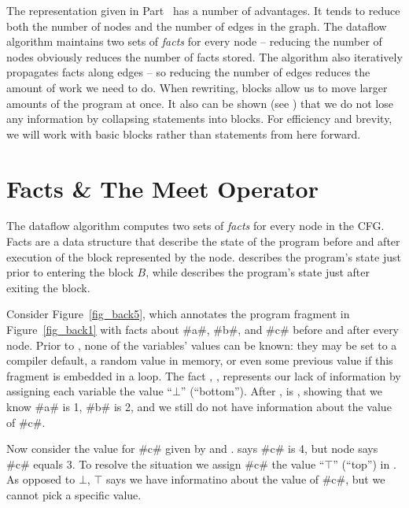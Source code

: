 \documentclass[12pt]{report}
\begin{document}
The representation given in Part~ has a number of
advantages. It tends to reduce both the number of nodes and the number
of edges in the graph. The dataflow algorithm maintains two sets of
\emph{facts} for every node -- reducing the number of nodes obviously
reduces the number of facts stored. The algorithm also iteratively
propagates facts along edges -- so reducing the number of edges
reduces the amount of work we need to do. When rewriting, blocks allow
us to move larger amounts of the program at once. It also can be shown
(see \citep{AhoXX}) that we do not lose any information by collapsing
statements into blocks. For efficiency and brevity, we will work with
basic blocks rather than statements from here forward.


\section{Facts \& The Meet Operator}
\label{sec_back4}

The dataflow algorithm computes two sets of \emph{facts} for every
node in the CFG. Facts are a data structure that describe the state of
the program before and after execution of the block represented by the
node. \inBa describes the program's state just prior to entering the
block $B$, while \outBa describes the program's state just after
exiting the block.



Consider Figure~\ref{fig_back5}, which annotates the program fragment
in Figure~\ref{fig_back1} with facts about #a#, #b#, and #c# before
and after every node. Prior to , none of the
variables' values can be known: they may be set to a compiler default,
a random value in memory, or even some previous value if this fragment
is embedded in a loop.  The fact , , represents our lack of information by assigning
each variable the value ``$\bot$'' (``bottom''). After
,  is , showing that we know #a# is 1, #b# is 2, and we still
do not have information about the value of #c#.

Now consider the value for #c# given by  and
.  says #c# is 4, but
node  says #c# equals $3$. To resolve the
situation we assign #c# the value ``$\top$'' (``top'') in
. As opposed to $\bot$, $\top$ says we
have informatino about the value of #c#, but we cannot pick a 
specific value.
\end{document}
